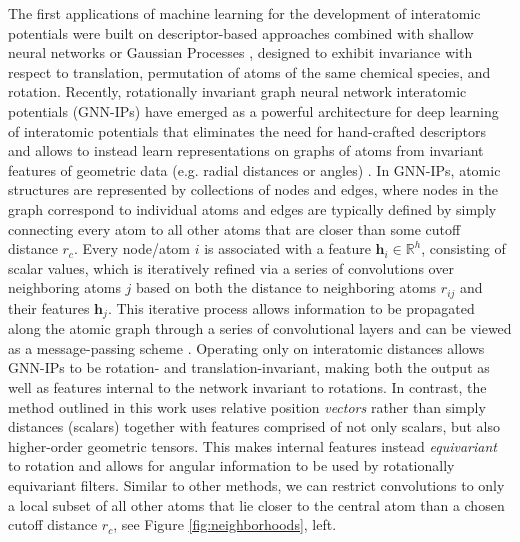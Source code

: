 \documentclass[%
reprint,
superscriptaddress,
nofootinbib,
amsmath,amssymb,
aps,
prl,
]{revtex4-1}
\begin{document}
The first applications of machine learning for the development of interatomic potentials were built on descriptor-based approaches combined with shallow neural networks or Gaussian Processes \cite{behler2007generalized, gaporiginalpaper}, designed to exhibit invariance with respect to translation, permutation of atoms of the same chemical species, and rotation. Recently, rotationally invariant graph neural network interatomic potentials (GNN-IPs) have emerged as a powerful architecture for deep learning of interatomic potentials that eliminates the need for hand-crafted descriptors and allows to instead learn representations on graphs of atoms from invariant features of geometric data (e.g. radial distances or angles) \cite{schnet_neurips, physnet_jctc, gnnff, klicpera2020directional}. In GNN-IPs, atomic structures are represented by collections of nodes and edges, where nodes in the graph correspond to individual atoms and edges are typically defined by simply connecting every atom to all other atoms that are closer than some cutoff distance $r_c$. Every node/atom $i$ is associated with a feature $\mathbf{h}_i \in \mathds{R}^{h}$, consisting of scalar values, which is iteratively refined via a series of convolutions over neighboring atoms $j$ based on both the distance to neighboring atoms $r_{ij}$ and their features $\mathbf{h}_j$. This iterative process allows information to be propagated along the atomic graph through a series of convolutional layers and can be viewed as a message-passing scheme \cite{gilmer2017neural}. Operating only on interatomic distances allows GNN-IPs to be rotation- and translation-invariant, making both the output as well as features internal to the network invariant to rotations. In contrast, the method outlined in this work uses relative position \textit{vectors} rather than simply distances (scalars) together with features comprised of not only scalars, but also higher-order geometric tensors. This makes internal features instead \textit{equivariant} to rotation and allows for angular information to be used by rotationally equivariant filters. Similar to other methods, we can restrict convolutions to only a local subset of all other atoms that lie closer to the central atom than a chosen cutoff distance $r_c$, see Figure \ref{fig:neighborhoods}, left.\\ 
\end{document}
